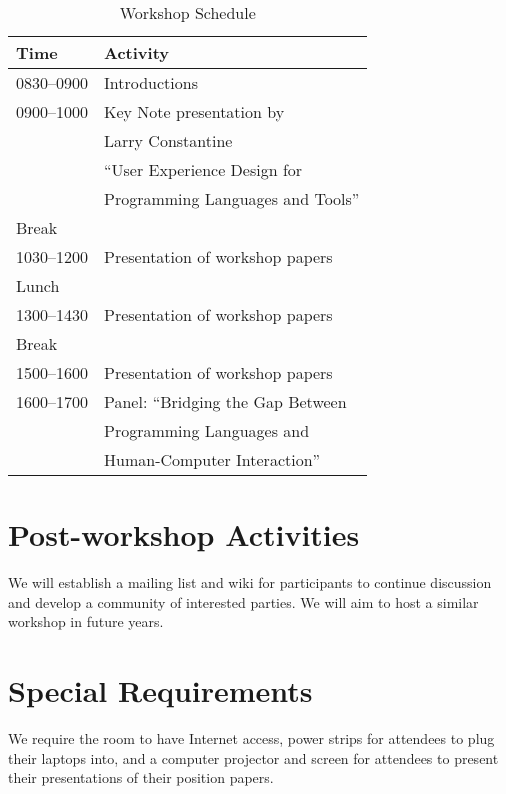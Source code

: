 \documentclass{sigplanconf}
\begin{document}
\begin{table} [!htbp] %
\begin{tabularx}{\columnwidth}{l|X}
\textbf{Time}   & \textbf{Activity} \\
\hline
0830--0900    & Introductions \vspace{1mm} \\
0900--1000    & Key Note presentation by \\
                & Larry Constantine\\
                & ``User Experience Design for \\
                & Programming Languages and Tools'' \vspace{1mm} \\
Break              & ~\vspace{1mm}\\
1030--1200   & Presentation of workshop papers \vspace{1mm}\\
Lunch             & ~\vspace{1mm}\\
1300--1430   & Presentation of workshop papers \vspace{1mm}\\
Break              & ~\vspace{1mm}\\
1500--1600    & Presentation of workshop papers \vspace{1mm}\\
1600--1700    & Panel: ``Bridging the Gap Between\\
                     & Programming Languages and\\
                     & Human-Computer Interaction'' \\

\end{tabularx}
\caption{Workshop Schedule}
\label{tab:schedule}
\end{table}

\section{Post-workshop Activities}

We will establish a mailing list and wiki for participants 
to continue discussion and develop a community of 
interested parties. 
We will aim to host a similar workshop in future years.

\section{Special Requirements}

We require the room to have Internet access, power strips for
attendees to plug their laptops into, and a computer projector and
screen for attendees to present their presentations of their position
papers.
\end{document}
